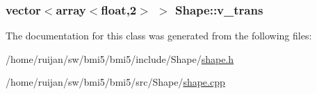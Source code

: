 \hypertarget{classShape_a5fb4760689b0acae7a6088da0cba7d7b}{
\subsubsection[{v\-\_\-trans}]{\setlength{\rightskip}{0pt plus 5cm}vector$<$array$<$float,2$>$ $>$ Shape\-::v\-\_\-trans}}\label{classShape_a5fb4760689b0acae7a6088da0cba7d7b}


The documentation for this class was generated from the following files\-:\begin{DoxyCompactItemize}
\item 
/home/ruijan/sw/bmi5/bmi5/include/\-Shape/\hyperlink{shape_8h}{shape.\-h}\item 
/home/ruijan/sw/bmi5/bmi5/src/\-Shape/\hyperlink{shape_8cpp}{shape.\-cpp}\end{DoxyCompactItemize}
